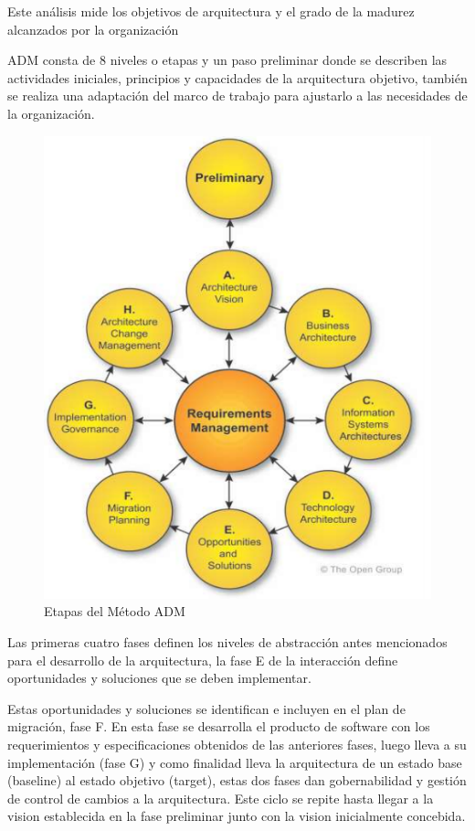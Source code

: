 Este análisis mide los objetivos de arquitectura y el grado de la madurez alcanzados por la organización

ADM consta de 8  niveles o etapas y un paso preliminar donde se describen las actividades iniciales, principios y capacidades de la arquitectura objetivo, también se realiza una adaptación del marco de trabajo para ajustarlo a las necesidades de la organización.
\cite{FGuti}

\begin{figure}[H]
	\centering
	\includegraphics[width=1.0\textwidth]{imagenes/Captura1.PNG}
	\caption{Etapas del Método ADM}
	\label{fig:gap_analysis}
\end{figure}

Las primeras cuatro fases definen los niveles de abstracción antes mencionados para el desarrollo de la arquitectura, la fase E de la interacción define oportunidades y soluciones que se deben implementar.

Estas oportunidades y soluciones se identifican e incluyen en el plan de migración, fase F. En esta fase se desarrolla el producto de software con los requerimientos y especificaciones obtenidos de las anteriores fases, luego lleva a su implementación (fase G) y como finalidad lleva la arquitectura de un estado base (baseline) al estado objetivo (target), estas dos fases dan gobernabilidad y gestión de control de cambios a la arquitectura. Este ciclo se repite hasta llegar a la vision establecida en la fase preliminar junto con la vision inicialmente concebida.



